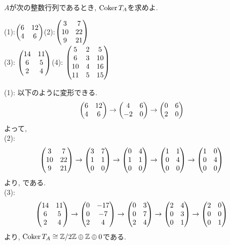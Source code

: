 \begin{egprob}
$A$が次の整数行列であるとき, $\mathrm{Coker}\,T_A$を求めよ.
\begin{center}
(1):$\begin{pmatrix} 6&12 \\ 4 & 6 \end{pmatrix} $\quad (2):$\begin{pmatrix} 3 & 7 \\ 10 & 22\\ 9&21 \end{pmatrix}$\\
(3): $\begin{pmatrix} 14 & 11 \\ 6 & 5\\ 2 & 4 \end{pmatrix}$\quad (4): $\begin{pmatrix} 5 & 2&5\\6&3&10\\ 10&4&16\\ 11&5&15 \end{pmatrix}$
\end{center}
\end{egprob}
\begin{egans}
(1): 以下のように変形できる.
\begin{eqnarray*}
\begin{pmatrix} 6 & 12 \\ 4 & 6 \end{pmatrix} \to \begin{pmatrix} 4 & 6 \\ -2 & 0 \end{pmatrix} \to \begin{pmatrix} 0 & 6 \\ 2 & 0 \end{pmatrix}
\end{eqnarray*}
よって, \\
(2):
\begin{eqnarray*}
\begin{pmatrix} 3&7\\10&22\\9&21 \end{pmatrix} \to \begin{pmatrix} 3&7\\1&1\\0&0 \end{pmatrix} \to \begin{pmatrix} 0&4\\1&1\\0&0 \end{pmatrix} \to \begin{pmatrix} 1&1\\0&4\\0&0 \end{pmatrix} \to \begin{pmatrix} 1 & 0 \\ 0&4\\0&0 \end{pmatrix}
\end{eqnarray*}
より, である. \\
(3):
\begin{eqnarray*}
\begin{pmatrix} 14&11\\6&5\\2&4 \end{pmatrix} \to \begin{pmatrix} 0&-17\\0&-7\\2&4 \end{pmatrix} \to \begin{pmatrix} 0&3\\0&7\\2&4 \end{pmatrix} \to \begin{pmatrix} 2&4\\0&3\\0&1 \end{pmatrix} \to \begin{pmatrix} 2&0\\0&0\\0&1 \end{pmatrix}
\end{eqnarray*}
より, $\mathrm{Coker}\,T_A \cong \mathbb{Z}/2\mathbb{Z} \oplus \mathbb{Z}\oplus 0$である.


\end{egans}
